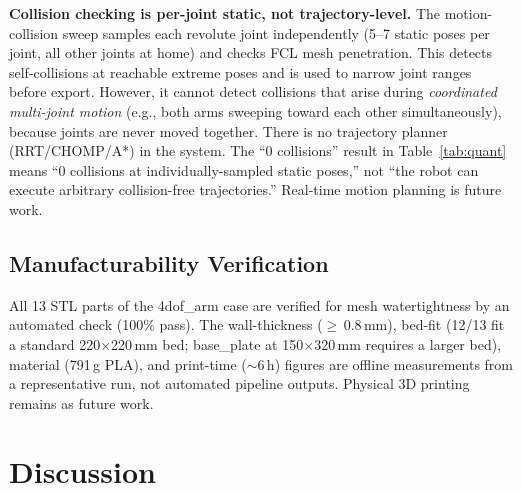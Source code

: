 \documentclass[conference]{IEEEtran}
\begin{document}
\textbf{Collision checking is per-joint static, not trajectory-level.} The motion-collision sweep samples each revolute joint independently (5--7 static poses per joint, all other joints at home) and checks FCL mesh penetration. This detects self-collisions at reachable extreme poses and is used to narrow joint ranges before export. However, it cannot detect collisions that arise during \emph{coordinated multi-joint motion} (e.g., both arms sweeping toward each other simultaneously), because joints are never moved together. There is no trajectory planner (RRT/CHOMP/A*) in the system. The ``0 collisions'' result in Table~\ref{tab:quant} means ``0 collisions at individually-sampled static poses,'' not ``the robot can execute arbitrary collision-free trajectories.'' Real-time motion planning is future work.

\subsection{Manufacturability Verification}
All 13 STL parts of the 4dof\_arm case are verified for mesh watertightness by an automated check (100\% pass). The wall-thickness ($\geq$\,0.8\,mm), bed-fit (12/13 fit a standard 220$\times$220\,mm bed; base\_plate at 150$\times$320\,mm requires a larger bed), material (791\,g PLA), and print-time ($\sim$6\,h) figures are offline measurements from a representative run, not automated pipeline outputs. Physical 3D printing remains as future work.

\section{Discussion}
\label{sec:discussion}
\end{document}
